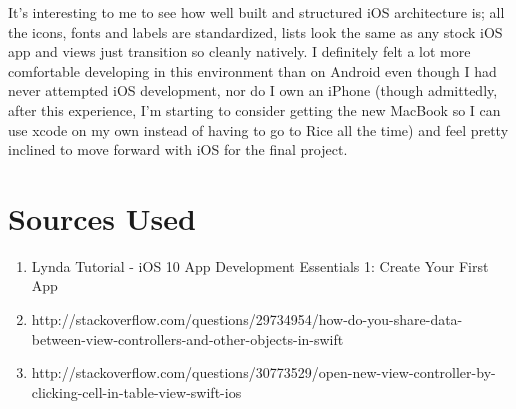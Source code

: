 \documentclass[12pt]{article}
\begin{document}
\noindent It's interesting to me to see how well built and structured iOS architecture is; all the icons, fonts and labels are standardized, lists look the same as any stock iOS app and views just transition so cleanly natively. I definitely felt a lot more comfortable developing in this environment than on Android even though I had never attempted iOS development, nor do I own an iPhone (though admittedly, after this experience, I'm starting to consider getting the new MacBook so I can use xcode on my own instead of having to go to Rice all the time) and feel pretty inclined to move forward with iOS for the final project.

\section{Sources Used}
\begin{enumerate}
\item Lynda Tutorial - iOS 10 App Development Essentials 1: Create Your First App
\item http://stackoverflow.com/questions/29734954/how-do-you-share-data-between-view-controllers-and-other-objects-in-swift
\item http://stackoverflow.com/questions/30773529/open-new-view-controller-by-clicking-cell-in-table-view-swift-ios
\end{enumerate}
\end{document}

